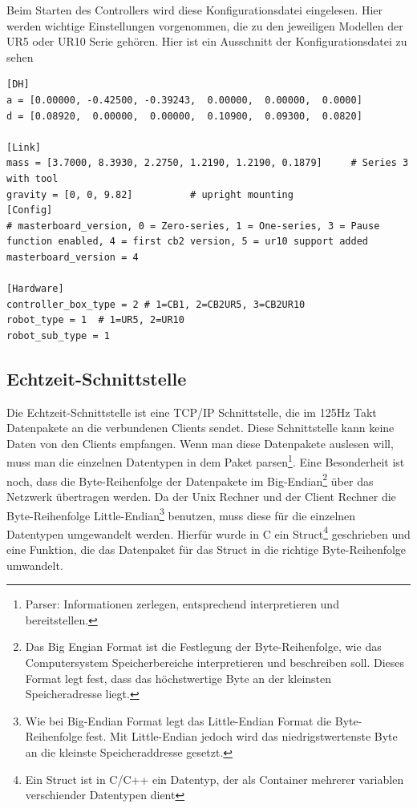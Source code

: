Beim Starten des Controllers wird diese Konfigurationsdatei eingelesen.
Hier werden wichtige Einstellungen vorgenommen, die zu den jeweiligen Modellen der UR5 oder UR10 Serie gehören. Hier ist ein Ausschnitt der Konfigurationsdatei zu sehen
\\
\begin{lstlisting}[caption={Ausschnitt aus der Datei urcontrol.conf zur Vorkonfigurierung des UR5 Roboters}, label=lst:ur5_conf ,captionpos=b]
[DH]
a = [0.00000, -0.42500, -0.39243,  0.00000,  0.00000,  0.0000]
d = [0.08920,  0.00000,  0.00000,  0.10900,  0.09300,  0.0820]

[Link]
mass = [3.7000, 8.3930, 2.2750, 1.2190, 1.2190, 0.1879]     # Series 3 with tool
gravity = [0, 0, 9.82]          # upright mounting
[Config]
# masterboard_version, 0 = Zero-series, 1 = One-series, 3 = Pause function enabled, 4 = first cb2 version, 5 = ur10 support added
masterboard_version = 4

[Hardware]
controller_box_type = 2 # 1=CB1, 2=CB2UR5, 3=CB2UR10
robot_type = 1  # 1=UR5, 2=UR10
robot_sub_type = 1
\end{lstlisting}

\subsection{Echtzeit-Schnittstelle}
\label{urcontrol_rci_gru}

Die Echtzeit-Schnittstelle ist eine \acs{TCP/IP} Schnittstelle, die im 125Hz Takt Datenpakete an die verbundenen Clients sendet. Diese Schnittstelle kann keine Daten von den Clients empfangen. Wenn man diese Datenpakete auslesen will, muss man die einzelnen Datentypen in dem Paket parsen\footnote{Parser: Informationen zerlegen, entsprechend interpretieren und bereitstellen.}. Eine Besonderheit ist noch, dass die Byte-Reihenfolge der Datenpakete im Big-Endian\footnote{Das Big Engian Format ist die Festlegung der Byte-Reihenfolge, wie das Computersystem Speicherbereiche interpretieren und beschreiben soll. Dieses Format legt fest, dass das höchstwertige Byte an der kleinsten Speicheradresse liegt.} über das Netzwerk übertragen werden. Da der Unix Rechner und der Client Rechner die Byte-Reihenfolge Little-Endian\footnote{Wie bei Big-Endian Format legt das Little-Endian Format die Byte-Reihenfolge fest. Mit Little-Endian jedoch wird das niedrigstwertenste Byte an die kleinste Speicheraddresse gesetzt.} benutzen, muss diese für die einzelnen Datentypen umgewandelt werden. Hierfür wurde in C ein Struct\footnote{Ein Struct ist in C/C++ ein Datentyp, der als Container mehrerer variablen verschiender Datentypen dient} geschrieben und eine Funktion, die das Datenpaket für das Struct in die richtige Byte-Reihenfolge umwandelt.

